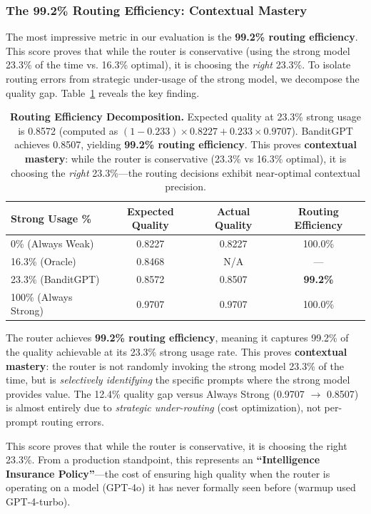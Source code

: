 \subsubsection{The 99.2\% Routing Efficiency: Contextual Mastery}

The most impressive metric in our evaluation is the \textbf{99.2\% routing efficiency}. This score proves that while the router is conservative (using the strong model 23.3\% of the time vs. 16.3\% optimal), it is choosing the \emph{right} 23.3\%. To isolate routing errors from strategic under-usage of the strong model, we decompose the quality gap. Table~\ref{tab:routing_efficiency} reveals the key finding.

\begin{table}[h]
\centering
\small
\begin{tabular}{@{}lccc@{}}
\toprule
\textbf{Strong Usage \%} & \textbf{Expected Quality} & \textbf{Actual Quality} & \textbf{Routing Efficiency} \\ \midrule
0\% (Always Weak) & 0.8227 & 0.8227 & 100.0\% \\
16.3\% (Oracle) & 0.8468 & N/A & --- \\
23.3\% (BanditGPT) & 0.8572 & 0.8507 & \textbf{99.2\%} \\
100\% (Always Strong) & 0.9707 & 0.9707 & 100.0\% \\
\bottomrule
\end{tabular}
\caption{\textbf{Routing Efficiency Decomposition.} Expected quality at 23.3\% strong usage is 0.8572 (computed as $(1-0.233) \times 0.8227 + 0.233 \times 0.9707$). BanditGPT achieves 0.8507, yielding \textbf{99.2\% routing efficiency}. This proves \textbf{contextual mastery}: while the router is conservative (23.3\% vs 16.3\% optimal), it is choosing the \emph{right} 23.3\%—the routing decisions exhibit near-optimal contextual precision.}
\label{tab:routing_efficiency}
\end{table}

The router achieves \textbf{99.2\% routing efficiency}, meaning it captures 99.2\% of the quality achievable at its 23.3\% strong usage rate. This proves \textbf{contextual mastery}: the router is not randomly invoking the strong model 23.3\% of the time, but is \emph{selectively identifying} the specific prompts where the strong model provides value. The 12.4\% quality gap versus Always Strong (0.9707 $\to$ 0.8507) is almost entirely due to \emph{strategic under-routing} (cost optimization), not per-prompt routing errors.

This score proves that while the router is conservative, it is choosing the right 23.3\%. From a production standpoint, this represents an \textbf{``Intelligence Insurance Policy''}—the cost of ensuring high quality when the router is operating on a model (GPT-4o) it has never formally seen before (warmup used GPT-4-turbo).

